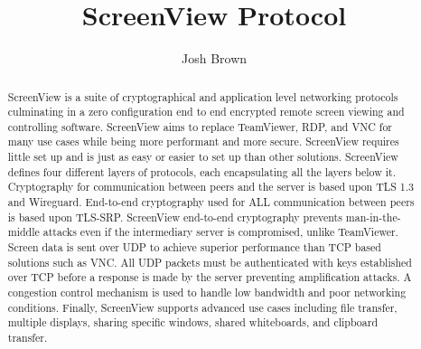 \documentclass{article}
\title{\textbf{ScreenView Protocol}}
\author{Josh Brown}
\begin{document}
    \maketitle

    \begin{abstract}

        ScreenView is a suite of cryptographical and application level networking protocols culminating in a
        zero configuration end to end encrypted remote screen viewing and controlling software. ScreenView aims to
        replace TeamViewer, RDP, and VNC for many use cases while being more performant and more secure. ScreenView
        requires little set up and is just as easy or easier to set up than other solutions. ScreenView defines four different
        layers of protocols, each encapsulating all the layers below it. Cryptography for communication between peers
        and the server is based upon TLS 1.3 and Wireguard. End-to-end cryptography used for ALL communication between
        peers is based upon TLS-SRP. ScreenView end-to-end cryptography prevents man-in-the-middle attacks even if
        the intermediary server is compromised, unlike TeamViewer. Screen data is sent over UDP to achieve superior
        performance than TCP based solutions such as VNC. All UDP packets must be authenticated with keys established
        over TCP before a response is made by the server preventing amplification attacks. A congestion control
        mechanism is used to handle low bandwidth and poor networking conditions. Finally, ScreenView supports
        advanced use cases including file transfer, multiple displays, sharing specific windows, shared whiteboards,
        and clipboard transfer.
    \end{abstract}

    \newpage

    \tableofcontents
    \newpage

    

    \newpage

    

    

    

    

    
\end{document}
